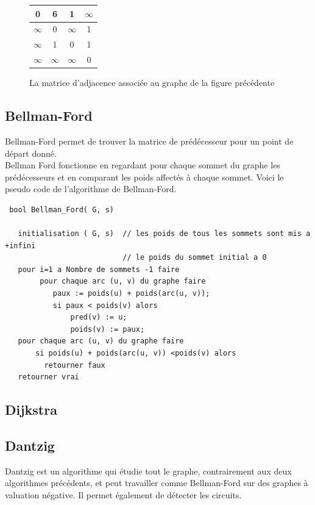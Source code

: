 \documentclass[a4paper,12pt,final] {article}
\begin{document}
\begin{figure}[htpd]
\begin{center}
\begin{tabular}{|c|c|c|c|}
\hline
0 & 6 & 1 & $\infty$\\
\hline
$\infty$ & 0 & $\infty$ & 1\\
\hline
$\infty$ & 1 & 0 & 1\\
\hline
$\infty$ & $\infty$ & $\infty$ & 0\\
\hline
\end{tabular}
\end{center}
\caption{La matrice d'adjacence associée au graphe de la figure précédente}
\end{figure}

\subsection{Bellman-Ford}
Bellman-Ford permet de trouver la matrice de prédécesseur pour un point de départ donné.\\
Bellman Ford fonctionne en regardant pour chaque sommet du graphe les prédécesseurs et en comparant les poids affectés à chaque sommet. Voici le pseudo code de l'algorithme de Bellman-Ford.
\begin{lstlisting}
 bool Bellman_Ford( G, s) 
 
   initialisation ( G, s)  // les poids de tous les sommets sont mis a +infini 
                           // le poids du sommet initial a 0
   pour i=1 a Nombre de sommets -1 faire
        pour chaque arc (u, v) du graphe faire
           paux := poids(u) + poids(arc(u, v)); 
           si paux < poids(v) alors
               pred(v) := u; 
               poids(v) := paux; 
   pour chaque arc (u, v) du graphe faire
       si poids(u) + poids(arc(u, v)) <poids(v) alors
         retourner faux 
   retourner vrai
\end{lstlisting}
\subsection{Dijkstra}
\subsection{Dantzig}

Dantzig est un algorithme qui étudie tout le graphe, contrairement aux deux algorithmes précédents, et peut travailler comme Bellman-Ford sur des graphes à valuation négative. Il permet également de détecter les circuits.\\
\end{document}
